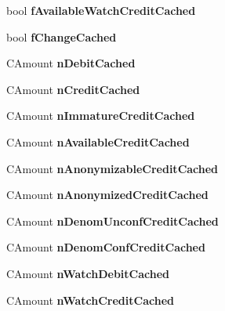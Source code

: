 \begin{DoxyCompactItemize}
bool {\bfseries f\+Available\+Watch\+Credit\+Cached}
\item 
\mbox{\label{class_c_wallet_tx_ab436a962e5e32d392928bc68af968bf1}} 
bool {\bfseries f\+Change\+Cached}
\item 
\mbox{\label{class_c_wallet_tx_aafed9b6aeecef4f9159ee73a8d69262d}} 
C\+Amount {\bfseries n\+Debit\+Cached}
\item 
\mbox{\label{class_c_wallet_tx_a6f6b791fc148e3ce053e229f8fe83496}} 
C\+Amount {\bfseries n\+Credit\+Cached}
\item 
\mbox{\label{class_c_wallet_tx_a6b9278766d4c82554b8b4976bff3ef2c}} 
C\+Amount {\bfseries n\+Immature\+Credit\+Cached}
\item 
\mbox{\label{class_c_wallet_tx_a095729d9d744bb1a47d07952f8aa159e}} 
C\+Amount {\bfseries n\+Available\+Credit\+Cached}
\item 
\mbox{\label{class_c_wallet_tx_ad68a73e3dde08f0f397147f825a09263}} 
C\+Amount {\bfseries n\+Anonymizable\+Credit\+Cached}
\item 
\mbox{\label{class_c_wallet_tx_af181c96d03d064524fec21c2f8d6f1c1}} 
C\+Amount {\bfseries n\+Anonymized\+Credit\+Cached}
\item 
\mbox{\label{class_c_wallet_tx_a1ecccbf8322abc397686907c0cbcefba}} 
C\+Amount {\bfseries n\+Denom\+Unconf\+Credit\+Cached}
\item 
\mbox{\label{class_c_wallet_tx_a2fcf31679a29b43c3a01dd44bf844aee}} 
C\+Amount {\bfseries n\+Denom\+Conf\+Credit\+Cached}
\item 
\mbox{\label{class_c_wallet_tx_aae59608618174f5c2dc4fa6036ffb76b}} 
C\+Amount {\bfseries n\+Watch\+Debit\+Cached}
\item 
\mbox{\label{class_c_wallet_tx_ad5585350b3917d52e0f0c54fbd8f48ba}} 
C\+Amount {\bfseries n\+Watch\+Credit\+Cached}
\item 

\end{DoxyCompactItemize}
